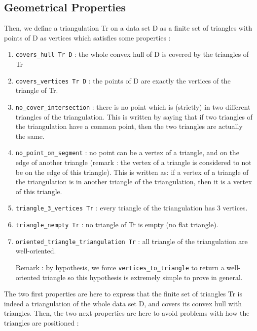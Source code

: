 \documentclass[a4paper,10pt]{article}
\begin{document}
\subsection{Geometrical Properties}
\label{definition_triangulation}
Then, we define a triangulation Tr on a data set D as a finite set of triangles with points of D as vertices which satisfies some properties :
\begin{enumerate}
\item {\tt covers\_hull Tr D} : the whole convex hull of D is covered by the triangles of Tr
\item {\tt covers\_vertices Tr D} : the points of D are exactly the vertices of the triangle of Tr.
\item {\tt no\_cover\_intersection} : there is no point which is (strictly) in two different triangles of the triangulation. This is written by saying that if two triangles of the triangulation have a common point, then the two triangles are actually the same.
  \item{\tt no\_point\_on\_segment} : no point can be a vertex of a triangle, and on the edge of another triangle (remark : the vertex of a triangle is considered to not be on the edge of this triangle). This is written as: if a vertex of a triangle of the triangulation is in another triangle of the triangulation, then it is a vertex of this triangle.
\item {\tt triangle\_3\_vertices Tr} : every triangle of the triangulation has 3 vertices.
\item {\tt triangle\_nempty Tr} : no triangle of Tr is empty (no flat triangle).
\item {\tt oriented\_triangle\_triangulation Tr} : all triangle of the triangulation are well-oriented.

  Remark : by hypothesis, we force {\tt vertices\_to\_triangle} to return a well-oriented triangle so this hypothesis is extremely simple to prove in general.
\end{enumerate}
The two first properties are here to express that the finite set of triangles Tr is indeed a triangulation of the whole data set D, and covers its convex hull with triangles.
Then, the two next properties are here to avoid problems with how the triangles are positioned : 
\end{document}

